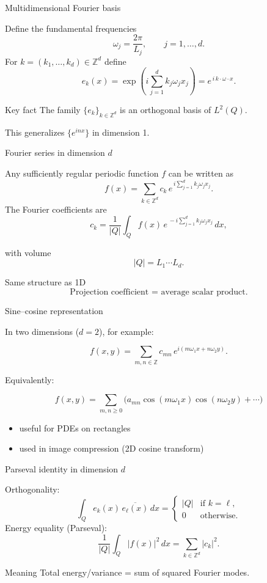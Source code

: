 \documentclass[aspectratio=169]{beamer}
\begin{document}
\begin{frame}{Multidimensional Fourier basis}

Define the fundamental frequencies
\[
\omega_j = \frac{2\pi}{L_j}, \qquad j=1,\dots,d.
\]
\pause
For $k=(k_1,\dots,k_d)\in\mathbb{Z}^d$ define
\[
e_k(x)=\exp\left(i\sum_{j=1}^d k_j \omega_j x_j\right)
= e^{\,i\,k\cdot \omega \cdot x}.
\]
\pause
\begin{block}{Key fact}
The family $\{e_k\}_{k\in\mathbb{Z}^d}$
is an orthogonal basis of $L^2(Q)$.
\end{block}

This generalizes $\{e^{inx}\}$ in dimension 1.
\end{frame}

\begin{frame}{Fourier series in dimension $d$}

Any sufficiently regular periodic function $f$ can be written as
\[
f(x)=\sum_{k\in\mathbb{Z}^d} c_k \, e^{\,i\sum_{j=1}^d k_j \omega_j x_j}.
\]
\pause
The Fourier coefficients are
\[
c_k = \frac{1}{|Q|}
\int_{Q} f(x)\,
e^{\,-i\sum_{j=1}^d k_j \omega_j x_j}\,dx,
\]

with volume
\[
|Q| = L_1\cdots L_d.
\]
\pause
\begin{block}{Same structure as 1D}
\[
\text{Projection coefficient = average scalar product}.
\]
\end{block}

\end{frame}

\begin{frame}{Sine–cosine representation}

In two dimensions ($d=2$), for example:

\[
f(x,y)=
\sum_{m,n\in\mathbb{Z}}
c_{mn}\,e^{i(m\omega_1 x + n\omega_2 y)}.
\]

Equivalently:

\[
f(x,y)=\sum_{m,n\ge0}
\Big(
a_{mn}\cos(m\omega_1 x)\cos(n\omega_2 y)
+\cdots
\Big)
\]
\pause
\begin{itemize}
    \item useful for PDEs on rectangles
    \item used in image compression (2D cosine transform)
\end{itemize}

\end{frame}

\begin{frame}{Parseval identity in dimension $d$}

Orthogonality:
\[
\int_Q e_k(x)\,\overline{e_\ell(x)}\,dx
=
\begin{cases}
|Q| & \text{if } k=\ell,\\
0 & \text{otherwise.}
\end{cases}
\]
\pause
Energy equality (Parseval):
\[
\frac{1}{|Q|}\int_Q |f(x)|^2\,dx
=
\sum_{k\in\mathbb{Z}^d} |c_k|^2.
\]

\begin{block}{Meaning}
Total energy/variance = sum of squared Fourier modes.
\end{block}

\end{frame}
\end{document}
